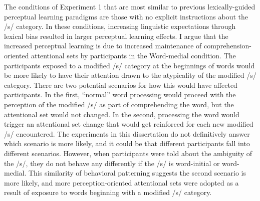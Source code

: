 The conditions of Experiment 1 that are most similar to previous lexically-guided perceptual learning paradigms are those with no explicit instructions about the /s/ category.
In these conditions, increasing linguistic expectations through lexical bias resulted in larger perceptual learning effects.
I argue that the increased perceptual learning is due to increased maintenance of comprehension-oriented attentional sets by participants in the Word-medial condition.
The participants exposed to a modified /s/ category at the beginnings of words would be more likely to have their attention drawn to the atypicality of the modified /s/ category.
There are two potential scenarios for how this would have affected participants.
In the first, ``normal'' word processing would proceed with the perception of the modified /s/ as part of comprehending the word, but the attentional set would not changed.
In the second, processing the word would trigger an attentional set change that would get reinforced for each new modified /s/ encountered.
The experiments in this dissertation do not definitively answer which scenario is more likely, and it could be that different participants fall into different scenarios.
However, when participants were told about the ambiguity of the /s/, they do not behave any differently if the /s/ is word-initial or word-medial.
This similarity of behavioral patterning suggests the second scenario is more likely, and more perception-oriented attentional sets were adopted as a result of exposure to words beginning with a modified /s/ category.

